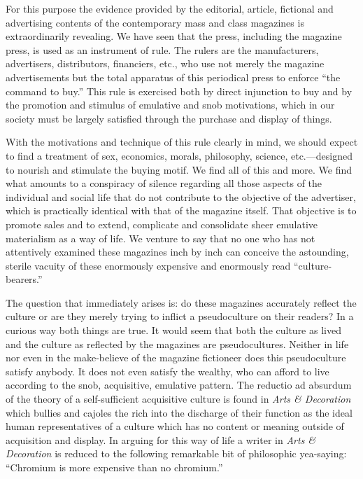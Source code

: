 \documentclass[openany,nobib]{tufte-book}
\begin{document}
For this purpose the evidence provided by the editorial, article,
fictional and advertising contents of the contemporary mass and class
magazines is extraordinarily revealing. We have seen that the press,
including the magazine press, is used as an instrument of rule. The
rulers are the manufacturers, advertisers, distributors, financiers,
etc., who use not merely the magazine advertisements but the total
apparatus of this periodical press to enforce ``the command to buy.''
This rule is exercised both by direct injunction to buy and by the
promotion and stimulus of emulative and snob motivations, which in our
society must be largely satisfied through the purchase and display of
things.

With the motivations and technique of this rule clearly in mind, we
should expect to find a treatment of sex, economics, morals, philosophy,
science, etc.---designed to nourish and stimulate the buying motif. We
find all of this and more. We find what amounts to a conspiracy of
silence regarding all those aspects of the individual and social life
that do not contribute to the objective of the advertiser, which is
practically identical with that of the magazine itself. That objective
is to promote sales and to extend, complicate and consolidate sheer
emulative materialism as a way of life. We venture to say that no one
who has not attentively examined these magazines inch by inch can
conceive the astounding, sterile vacuity of these enormously expensive
and enormously read ``culture-bearers.''

The question that immediately arises is: do these magazines accurately
reflect the culture or are they merely trying to inflict a pseudoculture
on their readers? In a curious way both things are true. It would seem
that both the culture as lived and the culture as reflected by the
magazines are pseudocultures. Neither in life nor even in the
make-believe of the magazine fictioneer does this pseudoculture satisfy
anybody. It does not even satisfy the wealthy, who can afford to live
according to the snob, acquisitive, emulative pattern. The reductio ad
absurdum of the theory of a self-sufficient acquisitive culture is found
in \emph{Arts \& Decoration} which bullies and cajoles the rich into the
discharge of their function as the ideal human representatives of a
culture which has no content or meaning outside of acquisition and
display. In arguing for this way of life a writer in \emph{Arts \&
Decoration} is reduced to the following remarkable bit of philosophic
yea-saying: ``Chromium is more expensive than no chromium.''
\end{document}
